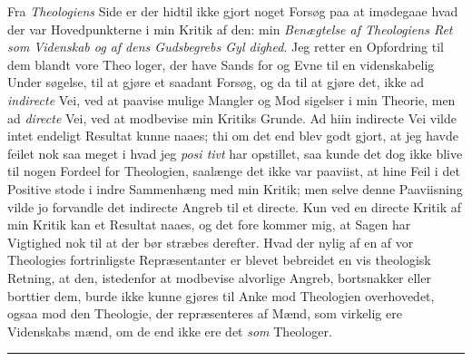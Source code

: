 Fra \emph{Theologiens} Side er der hidtil ikke gjort noget Forsøg paa at
imødegaae hvad der var Hovedpunkterne i min Kritik af den: min \emph{Benægtelse
af Theologiens Ret som Videnskab og af dens Gudsbegrebs Gyl\-%
dighed}. Jeg retter en Opfordring til dem blandt vore Theo\-%
loger, der have Sands for og Evne til en videnskabelig Under\-%
søgelse, til at gjøre et saadant Forsøg, og da til at gjøre det, ikke ad
\emph{indirecte} Vei, ved at paavise mulige Mangler og Mod\-%
sigelser i min Theorie, men ad \emph{directe} Vei, ved at modbevise min Kritiks
Grunde. Ad hiin indirecte Vei vilde intet endeligt Resultat kunne naaes; thi om
det end blev godt\-%
gjort, at jeg havde feilet nok saa meget i hvad jeg \emph{posi\-%
tivt} har opstillet, saa kunde det dog ikke blive til nogen Fordeel for
Theologien, saalænge det ikke var paaviist, at hine Feil i det Positive stode i
indre Sammenhæng med min Kritik; men selve denne Paaviisning vilde jo forvandle
det indirecte Angreb til et directe. Kun ved en directe Kritik af min Kritik kan
et Resultat naaes, og det fore\-%
kommer mig, at Sagen har Vigtighed nok til at der bør
 stræbes derefter. Hvad der nylig af en af vor Theologies fortrinligste
Repræsentanter er blevet bebreidet en vis theologisk Retning, at den, istedenfor
at modbevise alvorlige Angreb, bortsnakker eller borttier dem, burde ikke kunne
gjøres til Anke mod Theologien overhovedet, ogsaa mod den Theologie, der
repræsenteres af Mænd, som virkelig ere Videnskabs\-%
mænd, om de end ikke ere det \emph{som} Theologer.

\begin{center}\rule{2cm}{0.4pt}\end{center}

